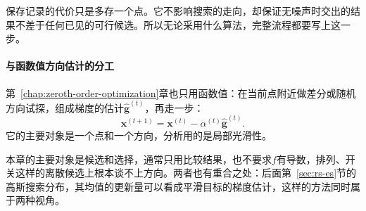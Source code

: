 保存记录的代价只是多存一个点。它不影响搜索的走向，却保证无噪声时交出的结果不差于任何已见的可行候选。所以无论采用什么算法，完整流程都要写上这一步。

\paragraph{与函数值方向估计的分工}
第~\ref{chap:zeroth-order-optimization}章也只用函数值：在当前点附近做差分或随机方向试探，组成梯度的估计$\hat{\bm{g}}^{(t)}$，再走一步：
\[
 \bm{x}^{(t+1)}=\bm{x}^{(t)}-\alpha^{(t)}\hat{\bm{g}}^{(t)}.
\]
它的主要对象是一个点和一个方向，分析用的是局部光滑性。

本章的主要对象是候选和选择，通常只用比较结果，也不要求$f$有导数，排列、开关这样的离散候选上根本谈不上方向。两者也有重合之处：后面第~\ref{sec:rs-es}节的高斯搜索分布，其均值的更新量可以看成平滑目标的梯度估计，这样的方法同时属于两种视角。
